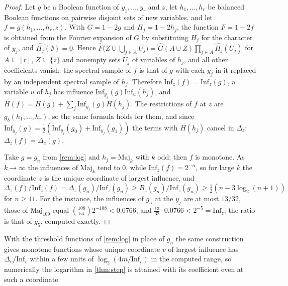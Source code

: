 \documentclass[11pt]{amsart}
\theoremstyle{remark}
\newcommand{\Inf}{\mathrm{Inf}}
\begin{document}
\begin{proof}
Let $g$ be a Boolean function of $y_1,\dots,y_r$ and $z$, let $h_1,\dots,h_r$ be balanced Boolean functions on pairwise
disjoint sets of new variables, and let $f=g(h_1,\dots,h_r,z)$. With $G=1-2g$ and $H_j=1-2h_j$, the function $F=1-2f$
is obtained from the Fourier expansion of $G$ by substituting $H_j$ for the character of $y_j$, and
$\widehat{H_j}(\emptyset)=0$. Hence $\widehat F\bigl(Z\cup\bigcup_{j\in A}U_j\bigr)=\widehat G(A\cup Z)\prod_{j\in A}\widehat{H_j}(U_j)$
for $A\subseteq[r]$, $Z\subseteq\{z\}$ and nonempty sets $U_j$ of variables of $h_j$, and all other coefficients vanish:
the spectral sample of $f$ is that of $g$ with each $y_j$ in it replaced by an independent spectral sample of $h_j$.
Therefore $\Inf_z(f)=\Inf_z(g)$, a variable $u$ of $h_j$ has influence $\Inf_{y_j}(g)\Inf_u(h_j)$, and
$H(f)=H(g)+\sum_j\Inf_{y_j}(g)H(h_j)$. The restrictions of $f$ at $z$ are $g_b(h_1,\dots,h_r)$, so the same formula holds
for them, and since $\Inf_{y_j}(g)=\frac12(\Inf_{y_j}(g_0)+\Inf_{y_j}(g_1))$ the terms with $H(h_j)$ cancel in
$\Delta_z$: $\Delta_z(f)=\Delta_z(g)$.

Take $g=g_n$ from \cref{rem:log} and $h_j=\mathrm{Maj}_k$ with $k$ odd; then $f$ is monotone. As $k\to\infty$ the
influences of $\mathrm{Maj}_k$ tend to $0$, while $\Inf_z(f)=2^{-n}$, so for large $k$ the coordinate $z$ is the unique
coordinate of largest influence, and $\Delta_z(f)/\Inf_z(f)=\Delta_z(g_n)/\Inf_z(g_n)\ge B_z(g_n)/\Inf_z(g_n)
\ge\frac12(n-3\log_2(n+1))$ for $n\ge11$. For the instance, the influences of $g_5$ at the $y_j$ are at most $13/32$,
those of $\mathrm{Maj}_{109}$ equal $\binom{108}{54}2^{-108}<0.0766$, and $\frac{13}{32}\cdot0.0766<2^{-5}=\Inf_z$; the
ratio is that of $g_5$, computed exactly.
\end{proof}

With the threshold functions of \cref{rem:log} in place of $g_n$ the same construction gives monotone functions whose
unique coordinate $v$ of largest influence has $\Delta_v/\Inf_v$ within a few units of $\log_2(4m/\Inf_v)$ in the
computed range, so numerically the logarithm in \cref{thm:step} is attained with its coefficient even at such a
coordinate.
\end{document}
